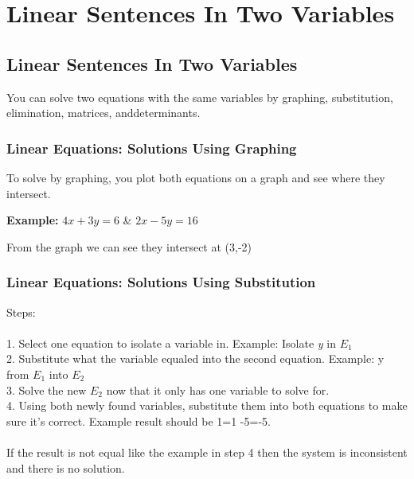 \chapter{Linear Sentences In Two Variables}

\section{Linear Sentences In Two Variables}
You can solve two equations with the same variables by graphing, substitution, elimination, matrices, anddeterminants.

\subsection{Linear Equations: Solutions Using Graphing}
To solve by graphing, you plot both equations on a graph and see where they intersect.

\textbf{Example:} $4x + 3y = 6$ \& $2x - 5y = 16$

\begin{center}
\end{center}

From the graph we can see they intersect at (3,-2)
\newpage
\subsection{Linear Equations: Solutions Using Substitution}
Steps: \\ \\
1. Select one equation to isolate a variable in. Example: Isolate \textit{y} in $E_1$\\
2. Substitute what the variable equaled into the second equation. Example: y from $E_1$ into $E_2$\\
3. Solve the new $E_2$ now that it only has one variable to solve for.\\
4. Using both newly found variables, substitute them into both equations to make sure it's correct. Example result should be 1=1 -5=-5.\\
\\
If the result is not equal like the example in step 4 then the system is inconsistent and there is no solution.

